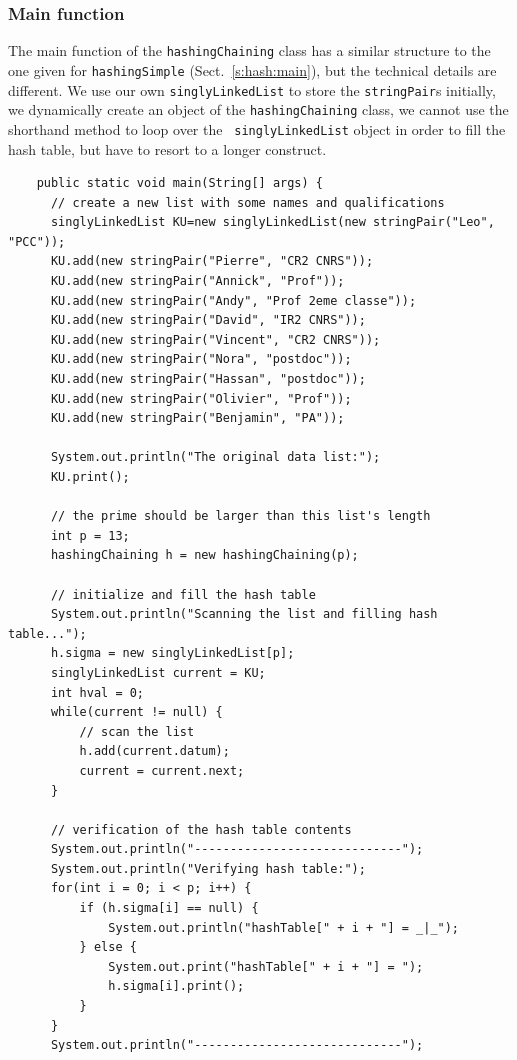 \documentclass[a4paper]{book}
\theoremstyle{changebreak}                %
\begin{document}
\subsubsection{Main function}
The main function of the {\tt hashingChaining} class has a similar
structure to the one given for {\tt hashingSimple}
(Sect.~\ref{s:hash:main}), but the technical details are different. We
use our own {\tt singlyLinkedList} to
store the {\tt stringPair}s initially, we
dynamically create an object of the {\tt hashingChaining} class, we
cannot use the shorthand method to loop over the {\tt
  singlyLinkedList} object in order to fill the hash table, but have
to resort to a longer construct.  {\small
\begin{verbatim}
    public static void main(String[] args) {
      // create a new list with some names and qualifications
      singlyLinkedList KU=new singlyLinkedList(new stringPair("Leo", "PCC"));
      KU.add(new stringPair("Pierre", "CR2 CNRS"));
      KU.add(new stringPair("Annick", "Prof"));
      KU.add(new stringPair("Andy", "Prof 2eme classe"));
      KU.add(new stringPair("David", "IR2 CNRS"));
      KU.add(new stringPair("Vincent", "CR2 CNRS"));
      KU.add(new stringPair("Nora", "postdoc"));
      KU.add(new stringPair("Hassan", "postdoc"));
      KU.add(new stringPair("Olivier", "Prof"));
      KU.add(new stringPair("Benjamin", "PA"));
      
      System.out.println("The original data list:");
      KU.print();
     
      // the prime should be larger than this list's length
      int p = 13; 
      hashingChaining h = new hashingChaining(p); 
      
      // initialize and fill the hash table	
      System.out.println("Scanning the list and filling hash table...");
      h.sigma = new singlyLinkedList[p]; 
      singlyLinkedList current = KU;
      int hval = 0;
      while(current != null) { 
          // scan the list
          h.add(current.datum);
          current = current.next;
      }
     
      // verification of the hash table contents
      System.out.println("-----------------------------");
      System.out.println("Verifying hash table:");
      for(int i = 0; i < p; i++) {
          if (h.sigma[i] == null) { 
              System.out.println("hashTable[" + i + "] = _|_");
          } else {
              System.out.print("hashTable[" + i + "] = ");
              h.sigma[i].print();
          }
      }
      System.out.println("-----------------------------");
     

\end{verbatim}}
\end{document}
